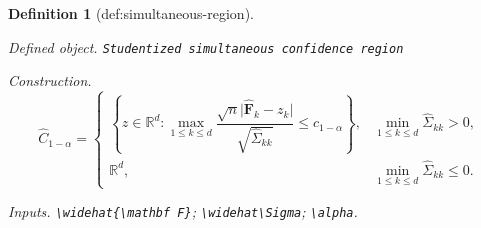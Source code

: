 \documentclass{article}
\newtheorem{definition}{Definition}
\begin{document}
\begin{definition}[def:simultaneous-region]\label{def:simultaneous-region}
\par\smallskip\noindent\emph{Defined object.} \texttt{Studentized simultaneous confidence region}
\par\smallskip\noindent\emph{Construction.} \[\widehat C_{1-\alpha}=\begin{cases}\left\{z\in\mathbb R^d:\max_{1\le k\le d}\dfrac{\sqrt n\lvert\widehat{\mathbf F}_k-z_k\rvert}{\sqrt{\widehat\Sigma_{kk}}}\le c_{1-\alpha}\right\},&\min_{1\le k\le d}\widehat\Sigma_{kk}>0,\\ \mathbb R^d,&\min_{1\le k\le d}\widehat\Sigma_{kk}\le0.\end{cases}\]
\par\smallskip\noindent\emph{Inputs.} \texttt{\textbackslash{}\allowbreak{}widehat\{\textbackslash{}\allowbreak{}mathbf F\}\allowbreak{}}; \texttt{\textbackslash{}\allowbreak{}widehat\textbackslash{}\allowbreak{}Sigma}; \texttt{\textbackslash{}\allowbreak{}alpha}.
\end{definition}
\end{document}

